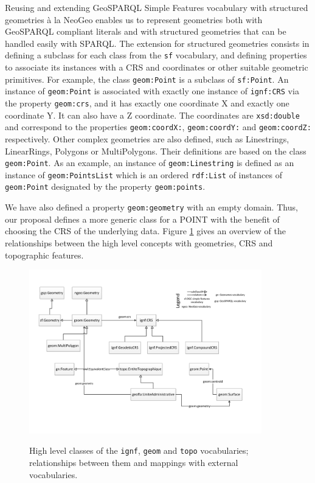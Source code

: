 Reusing and extending GeoSPARQL Simple Features vocabulary with structured geometries  \`a la NeoGeo enables us to represent geometries both with GeoSPARQL compliant literals and with structured geometries that can be handled easily with SPARQL. The extension for structured geometries consists in defining a subclass for each class from the \texttt{sf} vocabulary, and defining properties to associate its instances with a CRS and coordinates or other suitable geometric primitives. For example, the class \texttt{geom:Point} is a subclass of \texttt{sf:Point}. An instance of \texttt{geom:Point} is associated with exactly one instance of \texttt{ignf:CRS} via the property \texttt{geom:crs}, and it
has exactly one coordinate X and exactly one coordinate Y. It can also have a Z coordinate. The coordinates are \texttt{xsd:double} and correspond to the properties \texttt{geom:coordX:}, \texttt{geom:coordY:} and \texttt{geom:coordZ:} respectively. Other complex geometries are also defined, such as Linestrings, LinearRings, Polygons or MultiPolygons. Their definitions are based on the class \texttt{geom:Point}. As an example, an instance of \texttt{geom:Linestring} is defined as an instance of \texttt{geom:PointsList} which is an ordered \texttt{rdf:List} of instances of \texttt{geom:Point} designated by the property \texttt{geom:points}.


We have also defined a property \texttt{geom:geometry} with an empty domain. Thus, our proposal defines a more generic class for a \textsf{POINT} with the benefit of choosing the CRS of the underlying data. Figure \ref{fig:geomcrs} gives an overview of the relationships between the high level concepts with geometries, CRS and topographic features.

\begin{figure}[!htbp]
\vspace{-13pt}
  \begin{center}
  \includegraphics[width=0.9\textwidth]{img/vocabs-ign.pdf}
  \vspace{-15pt}
  \caption{High level classes of the \texttt{ignf}, \texttt{geom} and \texttt{topo} vocabularies; relationships between them and mappings with external vocabularies.}
  \vspace{-10pt}
  \label{fig:geomcrs}
  \end{center}
\end{figure}

